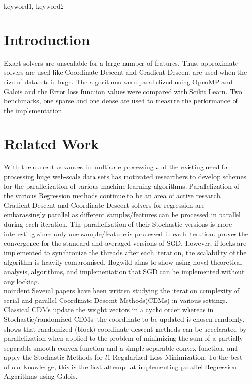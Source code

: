 \documentclass{sigplanconf}
\begin{document}
\keywords
keyword1, keyword2

\section{Introduction}
Exact solvers are unscalable for a large number of features. Thus, approximate solvers are used like Coordinate Descent and Gradient Descent are used 
when the size of datasets is huge. The algorithms were parallelized using OpenMP and Galois and the Error loss function 
values were compared with Scikit Learn. Two benchmarks, one sparse and one dense are used to measure the performance of the implementation.

\section{Related Work}
With the current advances in multicore processing and the existing need for processing huge web-scale data sets has motivated 
researchers to develop schemes for the parallelization of various machine learning algorithms. Parallelization of the various Regression 
methods continue to be an area of active research. Gradient Descent and Coordinate Descent solvers for regression are embarassingly parallel 
as different samples/features can be processed in parallel during each iteration. The parallelization of their Stochastic versions is more
interesting since only one sample/feature is processed in each iteration. \cite{zhang1} proves the convergence for the standard and averaged 
versions of SGD. However, if locks are implemented to synchronize the threads after each iteration, the scalability of the algorithm is heavily
compromised. Hogwild \cite{hogwild} aims to show using novel theoretical analysis, algorithms, and implementation that SGD can be implemented
without any locking. \\
{noindent}
Several papers have been written studying the iteration complexity of serial and parallel Coordinate Descent Methods(CDMs) in various settings.
Classical CDMs update the weight vectors in a cyclic order whereas in Stochastic/randomized CDMs, the coordinate to be updated is chosen randomly.
\cite{pcd1} shows that randomized (block) coordinate descent methods can be accelerated by parallelization when applied to the problem 
of minimizing the sum of a partially separable smooth convex function and a simple separable convex function. 
\cite{tewari} and \cite{shotgun} apply the Stochastic Methods for \begin{math}l1 \end{math} Regularized Loss Minimization. 
To the best of our knowledge, this is the first attempt at implementing parallel Regression Algorithms using Galois.
\end{document}
